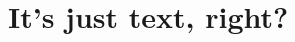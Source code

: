 \documentclass[../index.tex]{subfiles}
\begin{document}
\renewcommand{\sectiontitle}{It's just text, right?}
\section{\sectiontitle}
%
%

\end{document}
